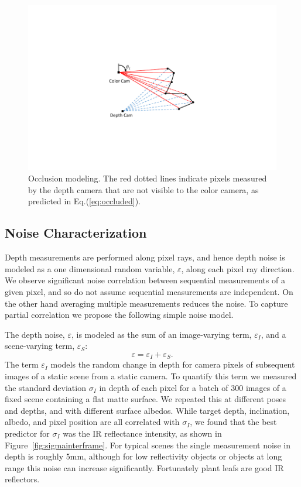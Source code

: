 \begin{figure}
\begin{center}
   \includegraphics[trim=130 90 140 90,clip,width=0.65\linewidth]{Figures/OcclusionModeling}
\end{center}
   \caption{Occlusion modeling.  The red dotted lines indicate pixels measured by the depth camera that are not visible to the color camera, as predicted in Eq.(\ref{eq:occluded}). }
\label{fig:occlusion}
\end{figure}


\subsection{Noise Characterization}
\label{sec:noise}

Depth measurements are performed along pixel rays, and hence depth noise is modeled as a one dimensional random variable, $\varepsilon$, along each pixel ray direction.  We observe significant noise correlation between sequential measurements of a given pixel, and so do not assume sequential measurements are independent.  On the other hand averaging multiple measurements reduces the noise.  To capture partial correlation we propose the following simple noise model. 

The depth noise, $\varepsilon$, is modeled as the sum of an image-varying term, $\varepsilon_I$, and a scene-varying term, $\varepsilon_S$:
\begin{equation}
\varepsilon = \varepsilon_I + \varepsilon_S. \label{eq:epsilon}
\end{equation}
The term $\varepsilon_I$ models the random change in depth for camera pixels of subsequent images of a static scene from a static camera.  To quantify this term we measured the standard deviation $\sigma_I$ in depth of each pixel for a batch of 300 images of a fixed scene containing a flat matte surface.  We repeated this at different poses and depths, and with different surface albedos.  While target depth, inclination, albedo, and pixel position are all correlated with $\sigma_I$, we found that the best predictor for $\sigma_I$ was the IR reflectance intensity, as shown in Figure~\ref{fig:sigmainterframe}.  For typical scenes the single measurement noise in depth is roughly 5mm, although for low reflectivity objects or objects at long range this noise can increase significantly.  Fortunately plant leafs are good IR reflectors.

